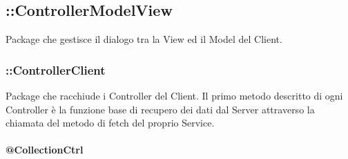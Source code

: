 \subsection{::ControllerModelView}
Package che gestisce il dialogo tra la View ed il Model del Client.

\subsubsection{::ControllerClient}
Package che racchiude i Controller del Client. Il primo metodo descritto di ogni Controller è la funzione base di recupero dei dati dal Server attraverso la chiamata del metodo di fetch del proprio Service.

\paragraph{@CollectionCtrl}
